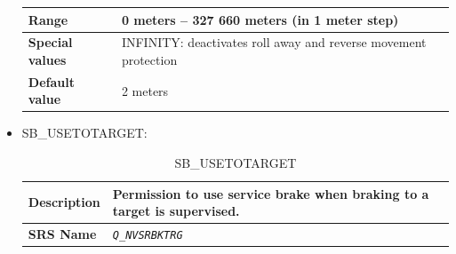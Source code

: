 \documentclass{template/openetcs}
\begin{document}
\begin{itemize}
\begin{longtable}{|l|l|}
				\hline
														
					\begin{minipage}[t]{0.22\linewidth} \textbf{Range}	\end{minipage} 
				&	\begin{minipage}[t]{0.78\linewidth} 0 meters – 327 660 meters (in 1 meter step) \end{minipage} \\
				
				\hline
																		
					\begin{minipage}[t]{0.22\linewidth} \textbf{Special values}	\end{minipage} 
				&	\begin{minipage}[t]{0.78\linewidth} INFINITY: deactivates roll away and reverse movement protection \end{minipage} \\
								
				\hline
										
					\begin{minipage}[t]{0.22\linewidth} \textbf{Default value}	\end{minipage} 
				&	\begin{minipage}[t]{0.78\linewidth} 2 meters \end{minipage} \\
				
				\hline
				
			\end{longtable}
			
			
		\item SB\_USETOTARGET:
		
			\begin{longtable}{|l|l|}
				\caption{SB\_USETOTARGET}\\ 																	
				\hline
				
					\begin{minipage}[t]{0.22\linewidth} \textbf{Description}	\end{minipage} 
				&	\begin{minipage}[t]{0.78\linewidth} Permission to use service brake when braking to a target is supervised. \end{minipage} \\
				
				\hline
				
					\begin{minipage}[t]{0.22\linewidth} \textbf{SRS Name}	\end{minipage} 
				&	\begin{minipage}[t]{0.78\linewidth} \emph{\texttt{Q\_NVSRBKTRG}} \end{minipage} \\
				

\end{longtable}
\end{itemize}
\end{document}
